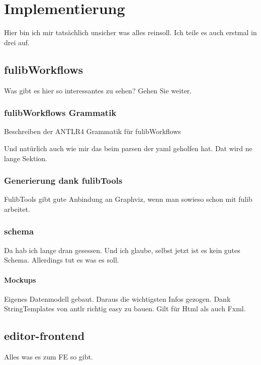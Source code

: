 \chapter{Implementierung}\label{ch:implementierung}
Hier bin ich mir tatsächlich unsicher was alles reinsoll.
Ich teile es auch erstmal in drei auf.

\section{fulibWorkflows}\label{sec:fulibworkflows2}
Was gibt es hier so interessantes zu sehen?
Gehen Sie weiter.

\subsection{fulibWorkflows Grammatik}\label{subsec:fulibworkflows-grammatik}
Beschreiben der ANTLR4 Grammatik für fulibWorkflows

Und natürlich auch wie mir das beim parsen der yaml geholfen hat.
Dat wird ne lange Sektion.

\subsection{Generierung dank fulibTools}\label{subsec:generierung-dank-fulibtools}
FulibTools gibt gute Anbindung an Graphviz, wenn man sowieso schon mit fulib arbeitet.

\subsection{schema}\label{subsec:schema}
Da hab ich lange dran gesessen.
Und ich glaube, selbst jetzt ist es kein gutes Schema.
Allerdings tut es was es soll.

\subsubsection{Mockups}
Eigenes Datenmodell gebaut.
Daraus die wichtigsten Infos gezogen.
Dank StringTemplates von antlr richtig easy zu bauen.
Gilt für Html als auch Fxml.

\section{editor-frontend}\label{sec:editor-frontend}
Alles was es zum FE so gibt.

